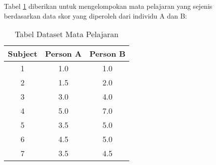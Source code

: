 \noindent Tabel \ref{table:datakmeans} diberikan untuk mengelompokan mata pelajaran yang sejenis berdasarkan data skor yang diperoleh dari individu A dan B:

\begin{table}[h]
\centering
\caption{Tabel Dataset Mata Pelajaran}
\vspace{0.2cm}
\begin{tabular}{|c|c|c|}
\hline 
Subject & Person A & Person B \\ 
\hline 
1 & 1.0 & 1.0 \\ 
\hline 
2 & 1.5 & 2.0 \\ 
\hline 
3 & 3.0 & 4.0 \\ 
\hline 
4 & 5.0 & 7.0 \\ 
\hline 
5 & 3.5 & 5.0 \\ 
\hline 
6 & 4.5 & 5.0 \\ 
\hline 
7 & 3.5 & 4.5 \\ 
\hline 
\end{tabular} 
\label{table:datakmeans}
\end{table}

